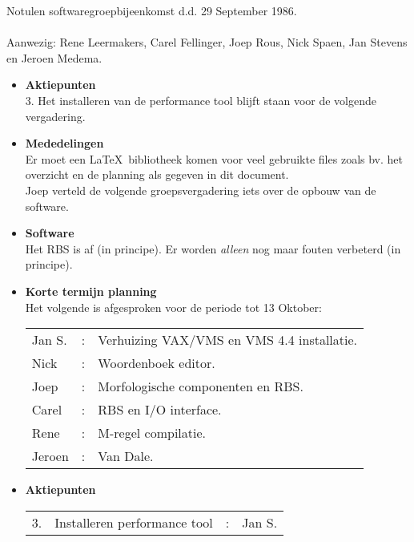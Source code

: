 Notulen softwaregroepbijeenkomst d.d. 29 September 1986. \\ \\ 
Aanwezig: Rene Leermakers, Carel Fellinger, Joep Rous, Nick 
Spaen, Jan Stevens en Jeroen Medema.\\ 
\begin{itemize}
 \item {\bf Aktiepunten}\\
 3. Het installeren van de performance tool blijft staan voor de volgende 
 vergadering.
 \item {\bf Mededelingen}\\
 Er moet een \LaTeX\ bibliotheek komen voor veel gebruikte files zoals bv. het 
 overzicht en de planning als gegeven in dit document.\\
 Joep verteld de volgende groepsvergadering iets over de opbouw van de software.
 \item {\bf Software}\\
 Het RBS is af (in principe). Er worden {\em alleen} nog maar fouten verbeterd 
 (in principe).
 \item {\bf Korte termijn planning}\\ 
 Het volgende is afgesproken voor de periode tot 13 Oktober:\\
 \begin{tabular}{lcl}
  Jan S. &:&Verhuizing VAX/VMS en VMS 4.4 installatie.\\
  Nick   &:&Woordenboek editor.                       \\
  Joep   &:&Morfologische componenten en RBS.         \\
  Carel  &:&RBS en I/O interface.                     \\
  Rene   &:&M-regel compilatie.                       \\
  Jeroen &:&Van Dale.                                 \\
 \end{tabular}
 \item {\bf Aktiepunten}\\
 \begin{tabular}{llcl}
  3.&Installeren performance tool&:&Jan S.\\
 \end{tabular}
\end{itemize}
